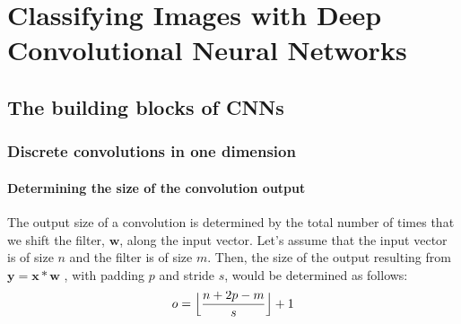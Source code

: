 \chapter{Classifying Images with Deep Convolutional Neural Networks\label{Ch14}}
\section{The building blocks of CNNs}
\subsection{Discrete convolutions in one dimension}
\subsubsection*{Determining the size of the convolution output}
The output size of a convolution is determined by the total number of times that we shift the filter, $\bm{w}$, along the input vector. Let's assume that the input vector is of size $n$ and the filter is of size $m$. Then, the size of the output resulting from $\bm{y}=\bm{x}*\bm{w}$ , with padding $p$ and stride $s$, would be determined as follows:
\begin{equation}
    o=\Bigl\lfloor\frac{n+2p-m}{s}\Bigr\rfloor+1
\end{equation}
